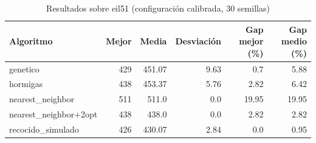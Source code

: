 \begin{table}[H]
\centering
\renewcommand{\arraystretch}{1.3}
\begin{tabular}{|l|r|r|r|r|r|}
\hline
Algoritmo & Mejor & Media & Desviación & Gap mejor (\%) & Gap medio (\%) \\
\hline
genetico & 429 & 451.07 & 9.63 & 0.7 & 5.88 \\
hormigas & 438 & 453.37 & 5.76 & 2.82 & 6.42 \\
nearest\_neighbor & 511 & 511.0 & 0.0 & 19.95 & 19.95 \\
nearest\_neighbor+2opt & 438 & 438.0 & 0.0 & 2.82 & 2.82 \\
recocido\_simulado & 426 & 430.07 & 2.84 & 0.0 & 0.95 \\
\hline
\end{tabular}
\caption{Resultados sobre eil51 (configuración calibrada, 30 semillas)}
\label{tab:eil51}
\end{table}
